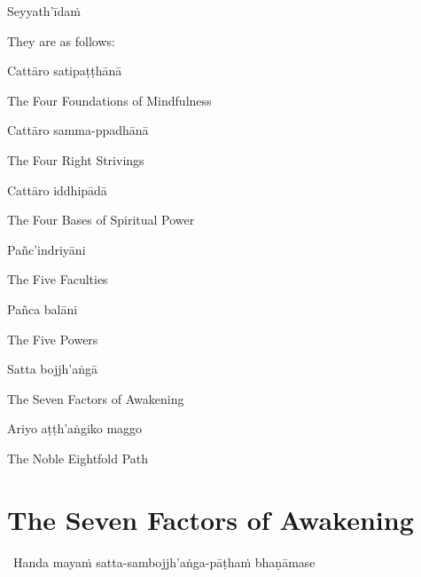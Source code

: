 \ifninebythirteenversion\clearpage\fi

Seyyath'īdaṁ

\begin{english}
  They are as follows:
\end{english}

\ifafiveversion\clearpage\fi
\ifbfiveversion\clearpage\fi

Cattāro satipaṭṭhānā

\begin{english}
  The Four Foundations of Mindfulness
\end{english}

Cattāro samma-ppadhānā

\begin{english}
  The Four Right Strivings
\end{english}

Cattāro iddhipādā

\begin{english}
  The Four Bases of Spiritual Power
\end{english}

Pañc'indriyāni

\begin{english}
  The Five Faculties
\end{english}

Pañca balāni

\begin{english}
  The Five Powers
\end{english}

Satta bojjh'aṅgā

\begin{english}
  The Seven Factors of Awakening
\end{english}

Ariyo aṭṭh'aṅgiko maggo

\begin{english}
  The Noble Eightfold Path
\end{english}

\suttaRef{[DN 16]}

\ifdigitalversion{}\fi



\section{The Seven Factors of Awakening}
\label{seven-factors-of-awakening}

\begin{leader}
  \anglebracketleft\ \hspace{-0.5mm}Handa mayaṁ satta-sambojjh'aṅga-pāṭhaṁ bhaṇāmase \hspace{-0.5mm}\anglebracketright\
\end{leader}


